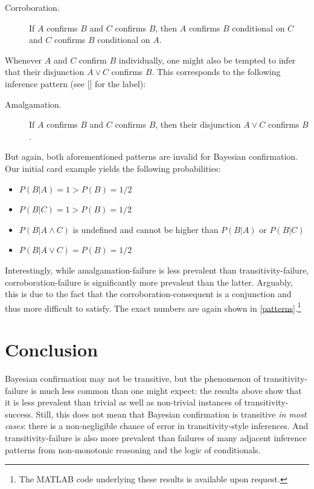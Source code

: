 \documentclass[a4paper,11pt]{article}
\begin{document}
\begin{description}
\item[Corroboration.] If $A$ confirms $B$ and $C$ confirms $B$, then $A$ confirms $B$ conditional on $C$ and $C$ confirms $B$ conditional on $A$.
\end{description}

\noindent Whenever $A$ and $C$ confirm $B$ individually, one might also be tempted to infer that their disjunction $A\lor C$ confirms $B$. This corresponds to the following inference pattern (see \citeauthor{Smith2016} [\citeyear{Smith2016}] for the label):

\begin{description}
\item[Amalgamation.] If $A$ confirms $B$ and $C$ confirms $B$, then their disjunction $A\lor C$ confirms $B$.
\end{description}

\noindent But again, both aforementioned patterns are invalid for Bayesian confirmation. Our initial card example yields the following probabilities:

\begin{itemize}
\item $P(B| A)=1 > P(B)=1/2$
\item $P(B| C)=1 > P(B)=1/2$
\item $P(B|A\land C)$ is undefined and cannot be higher than $P(B|A)$ or $P(B|C)$
\item $P(B| A\lor  C)= P(B)=1/2$
\end{itemize}

\noindent Interestingly, while amalgamation-failure is less prevalent than transitivity-failure, corroboration-failure is significantly more prevalent than the latter. Arguably, this is due to the fact that the corroboration-consequent is a conjunction and thus more difficult to satisfy. The exact numbers are again shown in \autoref{patterns}.\footnote{The MATLAB code underlying these results is available upon request.}


\section{Conclusion}
\label{conc}

Bayesian confirmation may not be transitive, but the phenomenon of transi\-tivity-failure is much less common than one might expect: the results above show that it is less prevalent than trivial as well as non-trivial instances of transitivity-success. Still, this does not mean that Bayesian confirmation is transitive \emph{in most cases}: there is a non-negligible chance of error in transitivity-style inferences. And transitivity-failure is also more prevalent than failures of many adjacent inference patterns from non-monotonic reasoning and the logic of conditionals.
\end{document}
